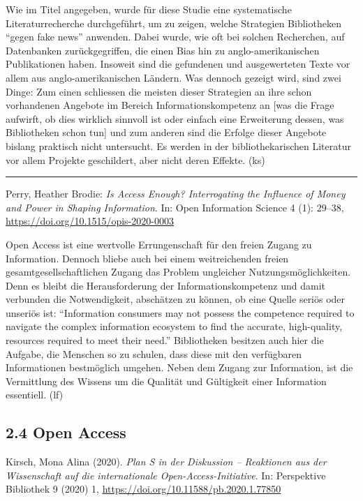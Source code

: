 \documentclass[a4paper,
fontsize=11pt,
oneside,
numbers=noperiodatend,
parskip=half-,
bibliography=totoc,
final
]{scrartcl}
\begin{document}
Wie im Titel angegeben, wurde für diese Studie eine systematische
Literaturrecherche durchgeführt, um zu zeigen, welche Strategien
Bibliotheken \enquote{gegen fake news} anwenden. Dabei wurde, wie oft
bei solchen Recherchen, auf Datenbanken zurückgegriffen, die einen Bias
hin zu anglo-amerikanischen Publikationen haben. Insoweit sind die
gefundenen und ausgewerteten Texte vor allem aus anglo-amerikanischen
Ländern. Was dennoch gezeigt wird, sind zwei Dinge: Zum einen schliessen
die meisten dieser Strategien an ihre schon vorhandenen Angebote im
Bereich Informationskompetenz an {[}was die Frage aufwirft, ob dies
wirklich sinnvoll ist oder einfach eine Erweiterung dessen, was
Bibliotheken schon tun{]} und zum anderen sind die Erfolge dieser
Angebote bislang praktisch nicht untersucht. Es werden in der
bibliothekarischen Literatur vor allem Projekte geschildert, aber nicht
deren Effekte. (ks)

\begin{center}\rule{0.5\linewidth}{0.5pt}\end{center}

Perry, Heather Brodie: \emph{Is Access Enough? Interrogating the
Influence of Money and Power in Shaping Information}. In: Open
Information Science 4 (1): 29--38,
\url{https://doi.org/10.1515/opis-2020-0003}

Open Access ist eine wertvolle Errungenschaft für den freien Zugang zu
Information. Dennoch bliebe auch bei einem weitreichenden freien
gesamtgesellschaftlichen Zugang das Problem ungleicher
Nutzungsmöglichkeiten. Denn es bleibt die Herausforderung der
Informationskompetenz und damit verbunden die Notwendigkeit, abschätzen
zu können, ob eine Quelle seriös oder unseriös ist: \enquote{Information
consumers may not possess the competence required to navigate the
complex information ecosystem to find the accurate, high-quality,
resources required to meet their need.} Bibliotheken besitzen auch hier
die Aufgabe, die Menschen so zu schulen, dass diese mit den verfügbaren
Informationen bestmöglich umgehen. Neben dem Zugang zur Information, ist
die Vermittlung des Wissens um die Qualität und Gültigkeit einer
Information essentiell. (lf)

\hypertarget{open-access}{%
\subsection{2.4 Open Access}\label{open-access}}

Kirsch, Mona Alina (2020). \emph{Plan S in der Diskussion -- Reaktionen
aus der Wissenschaft auf die internationale Open-Access-Initiative}. In:
Perspektive Bibliothek 9 (2020) 1,
\url{https://doi.org/10.11588/pb.2020.1.77850}
\end{document}
